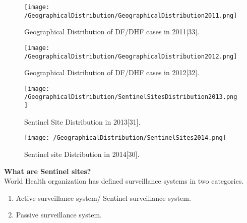 \documentclass[11pt]{exam}
\begin{document}
\begin{questions}
\begin{enumerate}
\begin{figure}[H]
  \centering
   \texttt{[image: /GeographicalDistribution/GeographicalDistribution2011.png]} 
  \caption{Geographical Distribution of DF/DHF cases in 2011[33].}
   \label{Geographical Distribution of DF/DHF Clusters}
\end{figure} 

\begin{figure}[H]
  \centering
   \texttt{[image: /GeographicalDistribution/GeographicalDistribution2012.png]} 
  \caption{Geographical Distribution of DF/DHF cases in 2012[32].}
   \label{Geographical Distribution of DF/DHF Clusters}
\end{figure} 

\begin{figure}[H]
  \centering
   \texttt{[image: /GeographicalDistribution/SentinelSitesDistribution2013.png]} 
  \caption{Sentinel Site Distribution in 2013[31].}
   \label{Geographical Distribution of DF/DHF Clusters}
\end{figure} 

\begin{figure}[H]
  \centering
   \texttt{[image: /GeographicalDistribution/SentinelSites2014.png]} 
  \caption{Sentinel site Distribution in 2014[30].}
   \label{Geographical Distribution of DF/DHF Clusters}
\end{figure} 

\newpage
\textbf{What are Sentinel sites?}\\
World Health organization has defined surveillance systems in two categories.
\begin{enumerate}
\item Active surveillance system/ Sentinel surveillance system.
\item Passive surveillance system. \newline
\end{enumerate} 


\end{enumerate}
\end{questions}
\end{document}
